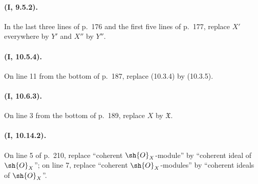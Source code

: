 \paragraph{(I, 9.5.2).}
In the last three lines of p.~176 and the first five lines of p.~177,
replace $X'$ everywhere by $Y'$ and $X''$ by $Y''$.

\paragraph{(I, 10.5.4).}
On line 11 from the bottom of p.~187, replace (10.3.4) by (10.3.5).

\paragraph{(I, 10.6.3).}
On line 3 from the bottom of p.~189, replace $X$ by $\mathfrak{X}$.

\paragraph{(I, 10.14.2).}
On line 5 of p.~210, replace ``coherent $\sh{O}_X$-module'' by
``coherent ideal of $\sh{O}_X$''; on line 7, replace ``coherent
$\sh{O}_X$-modules'' by ``coherent ideals of $\sh{O}_X$''.
